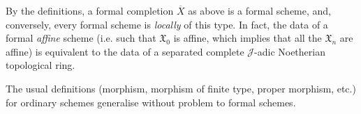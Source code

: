 By the definitions, a formal completion $\overline{X}$ as above is a formal scheme, and, conversely, every formal scheme is \emph{locally} of this type.
In fact, the data of a formal \emph{affine} scheme (i.e. such that $\mathfrak{X}_0$ is affine, which implies that all the $\mathfrak{X}_n$ are affine) is equivalent to the data of a separated complete $\mathcal{J}$-adic Noetherian topological ring.

The usual definitions (morphism, morphism of finite type, proper morphism, etc.) for ordinary schemes generalise without problem to formal schemes.
